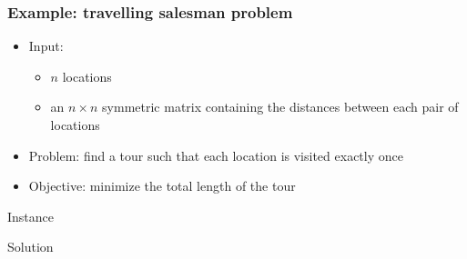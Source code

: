\documentclass[10pt]{beamer}
\begin{document}
\begin{frame}
  \frametitle{Example: travelling salesman problem}

  \small
  \begin{itemize}
    \item Input:
      \begin{itemize}
        \item $n$ locations
        \item an $n \times n$ symmetric matrix containing the distances between each pair of locations
      \end{itemize}
    \item Problem: find a tour such that each location is visited exactly once
    \item Objective: minimize the total length of the tour
  \end{itemize}

  \centering
  \begin{minipage}[t]{0.30\linewidth}
    \pause
    \centering
    Instance
    \bigskip

    \def\svgwidth{\columnwidth}
    
  \end{minipage}
  \hspace{1cm}
  \begin{minipage}[t]{0.30\linewidth}
    \pause
    \centering
    Solution
    \bigskip

    \def\svgwidth{\columnwidth}
    
  \end{minipage}
\end{frame}
\end{document}
